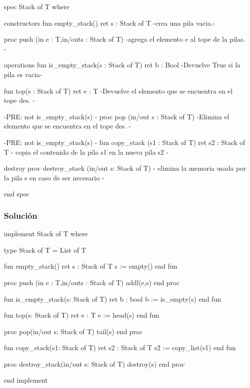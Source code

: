 \begin{codebox}
\begin{pascallike}
spec Stack of T where

constructors
    fun empty_stack() ret s : Stack of T
    {-crea una pila vacia.-}

    proc push (in e : T,in/outs : Stack of T)
    {-agrega el elemento e al tope de la pilas. -}

operations
    fun is_empty_stack(s : Stack of T) ret b : Bool
    {-Devuelve True si la pila es vacia-}

    fun top(s : Stack of T) ret e : T
    {-Devuelve el elemento que se encuentra en el tope des. -}

    {-PRE: not is_empty_stack(s) -}
    proc pop (in/out s : Stack of T)
    {-Elimina el elemento que se encuentra en el tope des. -}

    {-PRE: not is_empty_stack(s) -}
    fun copy_stack (s1 : Stack of T) ret s2 : Stack of T
    {- copia el contenido de la pila s1 en la nueva pila s2 -}

destroy
    proc destroy_stack (in/out s: Stack of T)
    {- elimina la memoria usada por la pila s en caso de ser necesario -}
    
end spec
\end{pascallike}
\end{codebox}

\subsubsection{Solución}
\begin{codebox}
\begin{pascallike}
implement Stack of T where

type Stack of T = List of T

fun empty_stack() ret s : Stack of T
    s := empty()
end fun

proc push (in e : T,in/outs : Stack of T)
    addl(e,s)
end proc

fun is_empty_stack(s: Stack of T) ret b : bool
    b := is_empty(s)
end fun

fun top(s: Stack of T) ret e : T
    e := head(s)
end fun

proc pop(in/out s: Stack of T)
    tail(s)
end proc

fun copy_stack(s1: Stack of T) ret s2 : Stack of T
    s2 := copy_list(s1)
end fun

proc destroy_stack(in/out s: Stack of T)
    destroy(s)
end proc

end implement
\end{pascallike}
\end{codebox}

